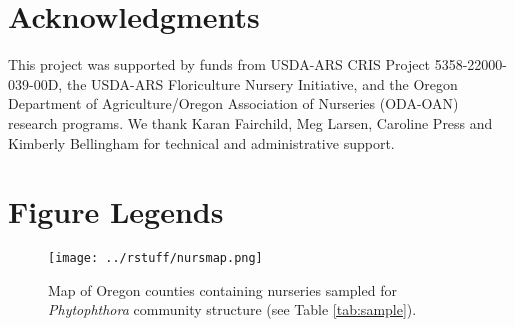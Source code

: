\documentclass[12pt]{article}
\begin{document}



\section*{\sffamily\normalsize{Acknowledgments}}
This project was supported by funds from USDA-ARS CRIS Project 5358-22000-039-00D, the USDA-ARS Floriculture Nursery Initiative, and the Oregon Department of Agriculture/Oregon Association of Nurseries (ODA-OAN) research programs. We thank Karan Fairchild, Meg Larsen, Caroline Press and Kimberly Bellingham for technical and administrative support. 

\renewcommand\refname{Literature Cited}


\clearpage

\section*{Figure Legends}






\begin{figure}[!ht]
\begin{center}
\texttt{[image: ../rstuff/nursmap.png]}
\end{center}
\caption{
Map of Oregon counties containing nurseries sampled for \emph{Phytophthora} community structure (see Table \ref{tab:sample}).
}
\label{fig:map}
\end{figure}
\clearpage
\end{document}
